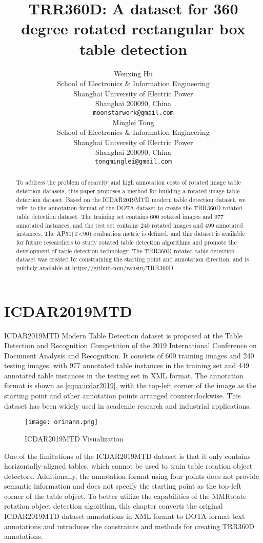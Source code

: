 \documentclass{article}
\title{TRR360D: A dataset for 360 degree rotated rectangular box table detection
}
\author{
  Wenxing Hu \\
  School of Electronics \& Information Engineering\\
  Shanghai University of Electric Power\\
  Shanghai 200090, China \\
  \texttt{moonstarwork@gmail.com} \\
\And
  Minglei Tong \\
  School of Electronics \& Information Engineering\\
  Shanghai University of Electric Power\\
  Shanghai 200090, China \\
  \texttt{tongminglei@gmail.com} \\
}
\begin{document}
\maketitle


\begin{abstract}
To address the problem of scarcity and high annotation costs of rotated image table detection datasets, this paper proposes a method for building a rotated image table detection dataset. Based on the ICDAR2019MTD modern table detection dataset, we refer to the annotation format of the DOTA dataset to create the TRR360D rotated table detection dataset. The training set contains 600 rotated images and 977 annotated instances, and the test set contains 240 rotated images and 499 annotated instances. The AP50(T<90) evaluation metric is defined, and this dataset is available for future researchers to study rotated table detection algorithms and promote the development of table detection technology. The TRR360D rotated table detection dataset was created by constraining the starting point and annotation direction, and is publicly available at \url{https://github.com/vansin/TRR360D}.
\end{abstract}





\section{ICDAR2019MTD}
ICDAR2019MTD\cite{Gao2019}  Modern Table Detection dataset is proposed at the Table Detection and Recognition Competition of the 2019 International Conference on Document Analysis and Recognition. It consists of 600 training images and 240 testing images, with 977 annotated table instances in the training set and 449 annotated table instances in the testing set in XML format. The annotation format is shown as \ref{equa:icdar2019}, with the top-left corner of the image as the starting point and other annotation points arranged counterclockwise. This dataset has been widely used in academic research and industrial applications.




\begin{figure}[ht]
    \centering
    \texttt{[image: orinann.png]}
    \caption{ICDAR2019MTD Visualization}
    \label{fig:orinann}
\end{figure}


One of the limitations of the ICDAR2019MTD dataset is that it only contains horizontally-aligned tables, which cannot be used to train table rotation object detectors. Additionally, the annotation format using four points does not provide semantic information and does not specify the starting point as the top-left corner of the table object. To better utilize the capabilities of the MMRotate\cite{Zhou2022} rotation object detection algorithm, this chapter converts the original ICDAR2019MTD dataset annotations in XML format to DOTA-format text annotations and introduces the constraints and methods for creating TRR360D annotations.
\end{document}
